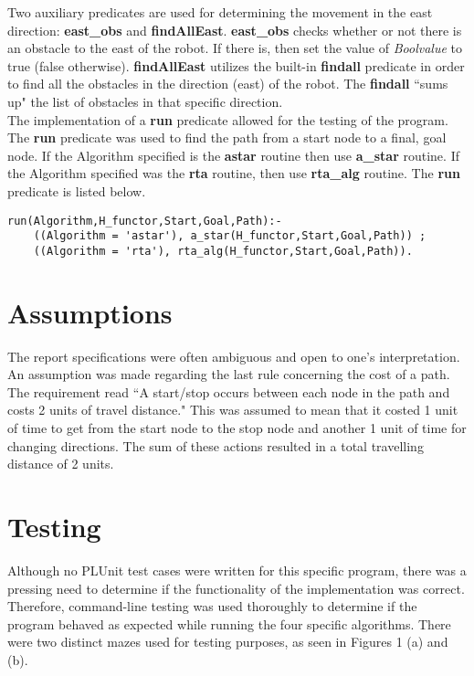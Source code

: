 \documentclass[11pt]{article}
\newcommand{\forceindent}{\leavevmode{\parindent=1em\indent}}
\begin{document}
\forceindent Two auxiliary predicates are used for determining the movement in the east direction: \textbf{east\_obs} and \textbf{findAllEast}. \textbf{east\_obs} checks whether or not there is an obstacle to the east of the robot. If there is, then set the value of \emph{Boolvalue} to true (false otherwise).
\textbf{findAllEast} utilizes the built-in \textbf{findall} predicate in order to find all the obstacles in the direction (east) of the robot. The \textbf{findall} ``sums up" the list of obstacles in that specific direction. \\


\forceindent The implementation of a \textbf{run} predicate allowed for the testing of the program. The \textbf{run} predicate was used to find the path from a start node to a final, goal node. If the Algorithm specified is the \textbf{astar} routine then use \textbf{a\_star} routine. If the Algorithm specified was the \textbf{rta} routine, then use \textbf{rta\_alg} routine. The \textbf{run} predicate is listed below. 
\begin{lstlisting} 
run(Algorithm,H_functor,Start,Goal,Path):-  
	((Algorithm = 'astar'), a_star(H_functor,Start,Goal,Path)) ; 
	((Algorithm = 'rta'), rta_alg(H_functor,Start,Goal,Path)).
\end{lstlisting}
\vspace{2 mm} 


\section{Assumptions}
\forceindent The report specifications were often ambiguous and open to one's interpretation. An assumption was made regarding the last rule concerning the cost of a path. The requirement read ``A start/stop occurs between each node in the path and costs 2 units of travel distance." This was assumed to mean that it costed 1 unit of time to get from the start node to the stop node and another 1 unit of time for changing directions. The sum of these actions resulted in a total travelling distance of 2 units.

\section{Testing}
\forceindent Although no PLUnit test cases were written for this specific program, there was a pressing need to determine if the functionality of the implementation was correct. Therefore, command-line testing was used thoroughly to determine if the program behaved as expected while running the four specific algorithms. There were two distinct mazes used for testing purposes, as seen in Figures 1 (a) and (b).
\begin{figure}[H]
\centering
\vspace{25mm}
\subfloat[Maze 1]{}
    \hspace{10cm}
\subfloat[Maze 2]{}
\caption{}
\end{figure}
\end{document}
